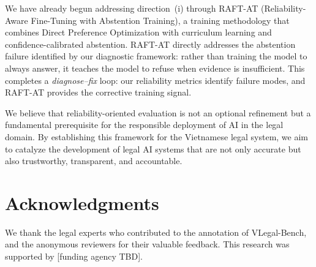 \documentclass[11pt,a4paper]{article}
\newcommand{\system}{VLegal-Bench}
\begin{document}
We have already begun addressing direction~(i) through RAFT-AT (Reliability-Aware Fine-Tuning with Abstention Training), a training methodology that combines Direct Preference Optimization with curriculum learning and confidence-calibrated abstention.
RAFT-AT directly addresses the abstention failure identified by our diagnostic framework: rather than training the model to always answer, it teaches the model to refuse when evidence is insufficient.
This completes a \emph{diagnose--fix} loop: our reliability metrics identify failure modes, and RAFT-AT provides the corrective training signal.

We believe that reliability-oriented evaluation is not an optional refinement but a fundamental prerequisite for the responsible deployment of AI in the legal domain.
By establishing this framework for the Vietnamese legal system, we aim to catalyze the development of legal AI systems that are not only accurate but also trustworthy, transparent, and accountable.

\section*{Acknowledgments}

We thank the legal experts who contributed to the annotation of \system{}, and the anonymous reviewers for their valuable feedback.
This research was supported by [funding agency TBD].



\end{document}
